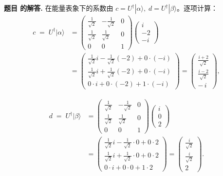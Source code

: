 \documentclass[12pt, a4paper, oneside]{ctexart}
\newcounter{problemname}
\newenvironment{solution}
  {\par\noindent\textbf{题目 \theproblemname 的解答. }}
  {\par}
\begin{document}
\begin{solution}
在能量表象下的系数由 \(c=U^\dagger|\alpha\rangle,\; d=U^\dagger|\beta\rangle\)。逐项计算：
\begin{align*}
c \;=\; U^\dagger|\alpha\rangle
&= \begin{pmatrix}
\frac{1}{\sqrt2} & -\frac{1}{\sqrt2} & 0\\[4pt]
\frac{1}{\sqrt2} & \frac{1}{\sqrt2} & 0\\[4pt]
0 & 0 & 1
\end{pmatrix}
\begin{pmatrix} i\\[2pt] -2\\[2pt] -i \end{pmatrix} \\[6pt]
&= \begin{pmatrix}
\frac{1}{\sqrt2}i -\frac{1}{\sqrt2}(-2) + 0\cdot(-i)\\[6pt]
\frac{1}{\sqrt2}i +\frac{1}{\sqrt2}(-2) + 0\cdot(-i)\\[6pt]
0\cdot i + 0\cdot(-2) + 1\cdot(-i)
\end{pmatrix}
= \begin{pmatrix}
\frac{i+2}{\sqrt2}\\[6pt]
\frac{i-2}{\sqrt2}\\[6pt]
-\,i
\end{pmatrix},
\end{align*}

\begin{align*}
d \;=\; U^\dagger|\beta\rangle
&= \begin{pmatrix}
\frac{1}{\sqrt2} & -\frac{1}{\sqrt2} & 0\\[4pt]
\frac{1}{\sqrt2} & \frac{1}{\sqrt2} & 0\\[4pt]
0 & 0 & 1
\end{pmatrix}
\begin{pmatrix} i\\[2pt] 0\\[2pt] 2 \end{pmatrix} \\[6pt]
&= \begin{pmatrix}
\frac{1}{\sqrt2}i -\frac{1}{\sqrt2}\cdot 0 + 0\cdot 2\\[6pt]
\frac{1}{\sqrt2}i +\frac{1}{\sqrt2}\cdot 0 + 0\cdot 2\\[6pt]
0\cdot i + 0\cdot 0 + 1\cdot 2
\end{pmatrix}
= \begin{pmatrix}
\frac{i}{\sqrt2}\\[6pt]
\frac{i}{\sqrt2}\\[6pt]
2
\end{pmatrix}.
\end{align*}


\end{solution}
\end{document}
